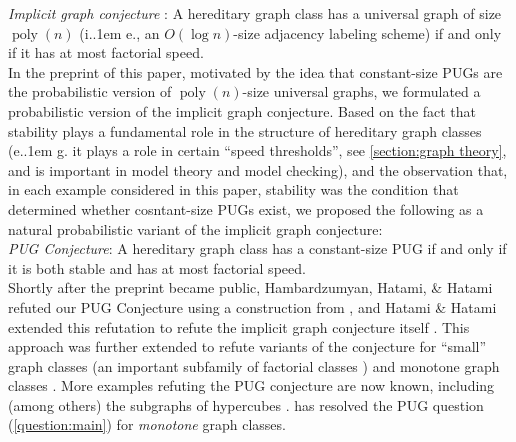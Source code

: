 \documentclass{article}
\makeatletter
\DeclareMathOperator{\poly}{poly}
\newcommand*\ie{i.\kern.1em e.\@\xspace} %
\newcommand*\eg{e.\kern.1em g.\@\xspace} %
\makeatother
\begin{document}
\noindent\emph{Implicit graph conjecture} \cite{KNR92,Spin03}:  A hereditary graph class
has a universal graph of size $\poly(n)$ (\ie, an $O(\log n)$-size adjacency labeling scheme) if
and only if it has at most factorial speed.\\

In the preprint of this paper, motivated by the idea that constant-size PUGs are the probabilistic
version of $\poly(n)$-size universal graphs, we formulated a probabilistic version of the implicit graph conjecture. Based on the fact that stability plays a fundamental role in the structure of hereditary
graph classes (\eg it plays a role in certain ``speed thresholds'', see \cref{section:graph theory},
and is important in model theory and model checking), and the observation that, in each example
considered in this paper, stability was the condition that determined whether cosntant-size PUGs
exist, we proposed the following as a natural probabilistic variant of the implicit graph
conjecture:\\

\noindent\emph{PUG Conjecture}: A hereditary graph class has a constant-size PUG if and only
if it is both stable and has at most factorial speed.\\

Shortly after the preprint became public, Hambardzumyan, Hatami, \& Hatami refuted our PUG
Conjecture \cite{HHH22counter} using a construction from \cite{HHH23dimfree}, and Hatami \& Hatami
extended this refutation to refute the implicit graph conjecture itself \cite{HH22}.  This approach
was further extended to refute variants of the conjecture for ``small'' graph classes (an important
subfamily of factorial classes \cite{BDSZZ24}) and monotone graph classes \cite{BDSZZ23}. More
examples refuting the PUG conjecture are now known, including (among others) the subgraphs of
hypercubes \cite{EHK22}. \cite{EHK22} has resolved the PUG question (\cref{question:main}) for
\emph{monotone} graph classes.
\end{document}
